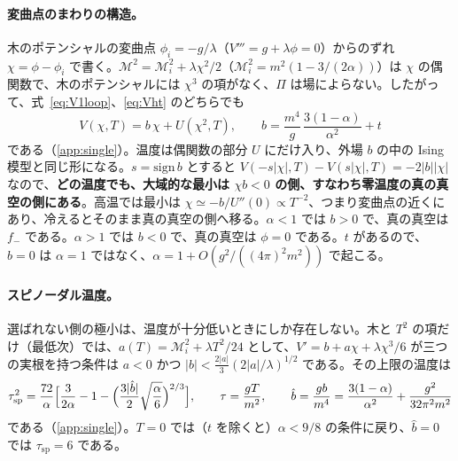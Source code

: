 \documentclass[a4paper,10pt]{ltjsarticle}
\begin{document}
\paragraph{変曲点のまわりの構造。}木のポテンシャルの変曲点 $\phi_i=-g/\lambda$（$V'''=g+\lambda\phi=0$）からのずれ $\chi=\phi-\phi_i$ で書く。$\mathcal M^2=\mathcal M_i^2+\lambda\chi^2/2$（$\mathcal M_i^2=m^2(1-3/(2\alpha))$）は $\chi$ の偶関数で、木のポテンシャルには $\chi^3$ の項がなく、$\Pi$ は場によらない。したがって、式~\eqref{eq:V1loop}、\eqref{eq:Vht} のどちらでも
\begin{equation}
V(\chi,T)=b\,\chi+U(\chi^2,T),\qquad b=\frac{m^4}{g}\,\frac{3(1-\alpha)}{\alpha^2}+t
\label{eq:Ising}
\end{equation}
である（\ref{app:single}）。温度は偶関数の部分 $U$ にだけ入り、外場 $b$ の中の Ising 模型と同じ形になる。$s=\mathrm{sign}\,b$ とすると $V(-s|\chi|,T)-V(s|\chi|,T)=-2|b||\chi|$ なので、\textbf{どの温度でも、大域的な最小は $\chi b<0$ の側、すなわち零温度の真の真空の側にある}。高温では最小は $\chi\simeq-b/U''(0)\propto T^{-2}$、つまり変曲点の近くにあり、冷えるとそのまま真の真空の側へ移る。$\alpha<1$ では $b>0$ で、真の真空は $f_-$ である。$\alpha>1$ では $b<0$ で、真の真空は $\phi=0$ である。$t$ があるので、$b=0$ は $\alpha=1$ ではなく、$\alpha=1+O(g^2/((4\pi)^2m^2))$ で起こる。

\paragraph{スピノーダル温度。}選ばれない側の極小は、温度が十分低いときにしか存在しない。木と $T^2$ の項だけ（最低次）では、$a(T)=\mathcal M_i^2+\lambda T^2/24$ として、$V'=b+a\chi+\lambda\chi^3/6$ が三つの実根を持つ条件は $a<0$ かつ $|b|<\frac{2|a|}{3}(2|a|/\lambda)^{1/2}$ である。その上限の温度は
\begin{equation}
\tau_{\mathrm{sp}}^2=\frac{72}{\alpha}\Bigl[\frac3{2\alpha}-1-\Bigl(\frac{3|\hat b|}{2}\sqrt{\frac\alpha6}\Bigr)^{2/3}\Bigr],\qquad
\tau=\frac{gT}{m^2},\qquad \hat b=\frac{gb}{m^4}=\frac{3(1-\alpha)}{\alpha^2}+\frac{g^2}{32\pi^2m^2}
\label{eq:tsp}
\end{equation}
である（\ref{app:single}）。$T=0$ では（$t$ を除くと）$\alpha<9/8$ の条件に戻り、$\hat b=0$ では $\tau_{\mathrm{sp}}=6$ である。
\end{document}
